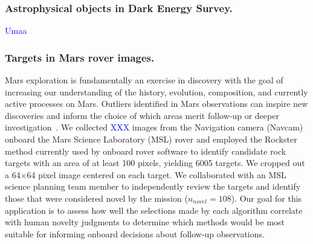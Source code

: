 \documentclass[letterpaper]{article} %
\newcommand{\todo}[1]{\textcolor{blue}{#1}}
\begin{document}
\subsubsection{Astrophysical objects in Dark Energy Survey.}
\todo{Umaa}

\subsubsection{Targets in Mars rover images.}
Mars exploration is fundamentally an exercise in discovery with the
goal of increasing our understanding of the history, evolution,
composition, and currently active processes on Mars.  Outliers
identified in Mars observations can inspire new discoveries and inform
the choice of which areas merit follow-up or deeper
investigation~\cite{kerner2020comparison,wagstaff:rover-novelty20}.
We collected \todo{XXX} images from the Navigation camera (Navcam) 
onboard the Mars Science Laboratory (MSL) rover
and employed the Rockster~\cite{burl:rockster16}
method currently used by onboard rover software to identify candidate rock
targets with an area of at least 100 pixels, yielding \num{6005}
targets.  We cropped out a \num{64}$\times$\num{64} pixel image
centered on each target.
%
We collaborated with an MSL science planning team member to
independently review the targets and identify those that were
considered novel by the mission ($n_{novel} = 108$).  Our goal for
this application is to assess how well the selections made by each
algorithm correlate with human novelty judgments to determine which
methods would be most suitable for informing onboard decisions about
follow-up observations.
\end{document}

